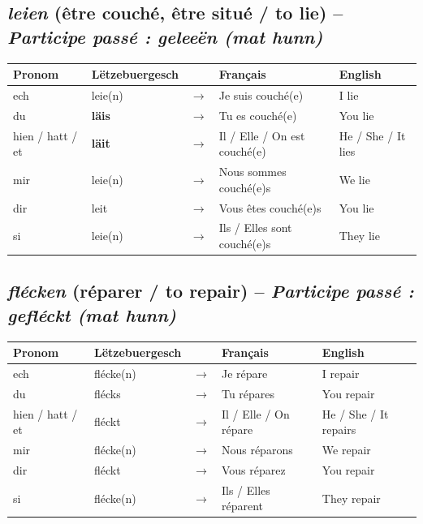 \subsection{\textit{leien} (être couché, être situé / to lie) -- \textit{Participe passé : geleeën (mat hunn)}}
\begin{center}
    \begin{tabular}{ll c l l}
        \toprule
        \textbf{Pronom} & \textbf{Lëtzebuergesch} & & \textbf{Français} & \textbf{English} \\
        \midrule
        ech & leie(n) & $\rightarrow$ & Je suis couché(e) & I lie \\
        du & \textbf{läis} & $\rightarrow$ & Tu es couché(e) & You lie \\
        hien / hatt / et & \textbf{läit} & $\rightarrow$ & Il / Elle / On est couché(e) & He / She / It lies \\
        \midrule
        mir & leie(n) & $\rightarrow$ & Nous sommes couché(e)s & We lie \\
        dir & leit & $\rightarrow$ & Vous êtes couché(e)s & You lie \\
        si & leie(n) & $\rightarrow$ & Ils / Elles sont couché(e)s & They lie \\
        \bottomrule
    \end{tabular}
\end{center}

\subsection{\textit{flécken} (réparer / to repair) -- \textit{Participe passé : gefléckt (mat hunn)}}
\begin{center}
    \begin{tabular}{ll c l l}
        \toprule
        \textbf{Pronom} & \textbf{Lëtzebuergesch} & & \textbf{Français} & \textbf{English} \\
        \midrule
        ech & flécke(n) & $\rightarrow$ & Je répare & I repair \\
        du & flécks & $\rightarrow$ & Tu répares & You repair \\
        hien / hatt / et & fléckt & $\rightarrow$ & Il / Elle / On répare & He / She / It repairs \\
        \midrule
        mir & flécke(n) & $\rightarrow$ & Nous réparons & We repair \\
        dir & fléckt & $\rightarrow$ & Vous réparez & You repair \\
        si & flécke(n) & $\rightarrow$ & Ils / Elles réparent & They repair \\
        \bottomrule
    \end{tabular}
\end{center}

